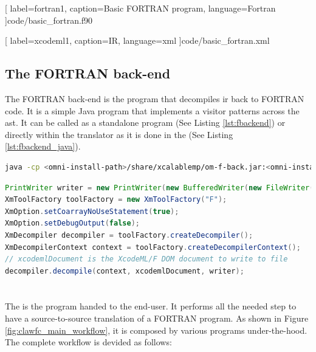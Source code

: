 
  [
    label=fortran1,
    caption=Basic FORTRAN program,
    language=Fortran
  ]{code/basic_fortran.f90}


  [
    label=xcodeml1,
    caption=\xcodeml IR,
    language=xml
  ]{code/basic_fortran.xml}

\subsection{The FORTRAN back-end}
The FORTRAN back-end is the program that decompiles \gls{ir} back to FORTRAN
code. It is a simple Java program that implements a visitor patterns across
the \gls{ast}. It can be called as a standalone program (See Listing \ref{lst:fbackend}) or directly within the
translator as it is done in the \clawfcomp (See Listing \ref{lst:fbackend_java}).

\begin{lstlisting}[label=lst:fbackend, language=Bash, caption=Execute the FORTRAN back-end as a standalone]
java -cp <omni-install-path>/share/xcalablemp/om-f-back.jar:<omni-install-path>/share/xcalablemp/om-exc-tools.jar xcodeml.f.util.omx2f -l xcodeml.xml
\end{lstlisting}

\begin{lstlisting}[label=lst:fbackend_java, language=Java, caption=FORTRAN back-end called from Java]
PrintWriter writer = new PrintWriter(new BufferedWriter(new FileWriter(outputFile)));
XmToolFactory toolFactory = new XmToolFactory("F");
XmOption.setCoarrayNoUseStatement(true);
XmOption.setDebugOutput(false);
XmDecompiler decompiler = toolFactory.createDecompiler();
XmDecompilerContext context = toolFactory.createDecompilerContext();
// xcodemlDocument is the XcodeML/F DOM document to write to file
decompiler.decompile(context, xcodemlDocument, writer); 
\end{lstlisting}

\section{\clawfcomp}
The \clawfc is the program handed to the end-user. It performs all the needed
step to have a source-to-source translation of a FORTRAN program. As shown in
Figure \ref{fig:clawfc_main_workflow}, it is composed by various programs
under-the-hood. The complete workflow is devided as follows:

